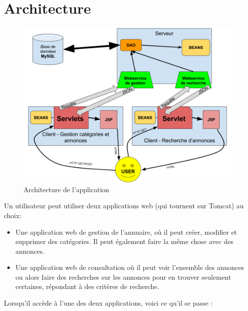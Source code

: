 \chapter{Architecture}

\begin{figure}[H]
    \centering\includegraphics[width=1\textwidth]{images/archi.png}
    \caption{Architecture de l'application}
\end{figure}

Un utilisateur peut utiliser deux applications web (qui tournent sur Tomcat) au choix:
\begin{itemize}
  \item Une application web de gestion de l'annuaire, où il peut créer, modifier et supprimer des catégories. Il peut également faire la même chose avec des annonces.
  \item Une application web de consultation où il peut voir l'ensemble des annonces ou alors faire des recherches sur les annonces pour en trouver seulement certaines, répondant à des critères de recherche.
\end{itemize}

Lorsqu'il accède à l'une des deux applications, voici ce qu'il se passe :

